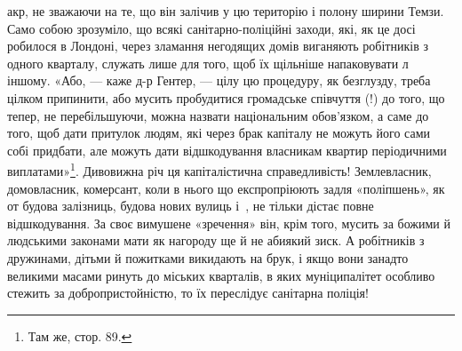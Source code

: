 \parcont{}  %
акр, не зважаючи на те, що він залічив у цю територію і полону
ширини Темзи. Само собою зрозуміло, що всякі санітарно-поліційні
заходи, які, як це досі робилося в Лондоні, через
зламання негодящих домів виганяють робітників з одного кварталу,
служать лише для того, щоб їх щільніше напаковувати
л іншому. «Або, — каже д-р Гентер, — цілу цю процедуру,
як безглузду, треба цілком припинити, або мусить пробудитися
громадське співчуття (!) до того, що тепер, не перебільшуючи,
можна назвати національним обов’язком, а саме до того, щоб
дати притулок людям, які через брак капіталу не можуть його
сами собі придбати, але можуть дати відшкодування власникам
квартир періодичними виплатами»\footnote{
Там же, стор. 89.
}. Дивовижна річ ця капіталістична
справедливість! Землевласник, домовласник, комерсант,
коли в нього що експропріюють задля «поліпшень», як от
будова залізниць, будова нових вулиць і~, не тільки дістає
повне відшкодування. За своє вимушене «зречення» він, крім
того, мусить за божими й людськими законами мати як нагороду
ще й не абиякий зиск. А робітників з дружинами, дітьми й пожитками
викидають на брук, і якщо вони занадто великими масами
ринуть до міських кварталів, в яких муніципалітет особливо
стежить за добропристойністю, то їх переслідує санітарна поліція!

